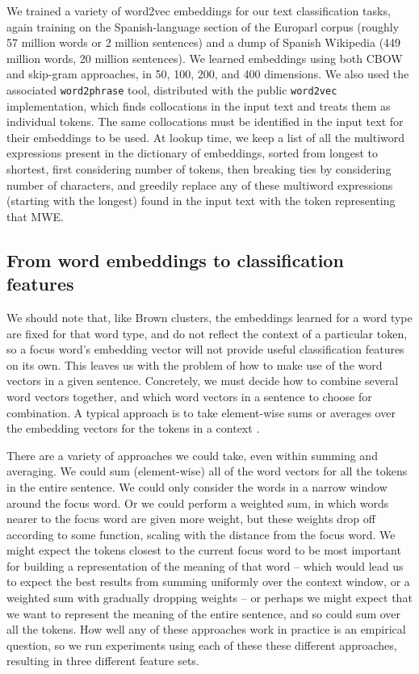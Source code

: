 We trained a variety of word2vec embeddings for our text classification tasks,
again training on the Spanish-language section of the Europarl corpus (roughly
57 million words or 2 million sentences) and a dump of Spanish Wikipedia (449
million words, 20 million sentences). We learned embeddings using both CBOW and
skip-gram approaches, in 50, 100, 200, and 400 dimensions. We also
used the associated \texttt{word2phrase} tool, distributed with the public
\texttt{word2vec} implementation, which finds collocations in the input text
and treats them as individual tokens. The same collocations must be identified
in the input text for their embeddings to be used. At lookup time, we keep a
list of all the multiword expressions present in the dictionary of embeddings,
sorted from longest to shortest, first considering number of tokens, then
breaking ties by considering number of characters, and greedily replace any of
these multiword expressions (starting with the longest) found in the input text
with the token representing that MWE.

\subsection{From word embeddings to classification features}
We should note that, like Brown clusters, the embeddings learned for a word
type are fixed for that word type, and do not reflect the context of a
particular token, so a focus word's embedding vector will not provide useful
classification features on its own. This leaves us with the problem of how to
make use of the word vectors in a given sentence. Concretely, we must decide
how to combine several word vectors together, and which word vectors in a
sentence to choose for combination. A typical approach is to take element-wise
sums or averages over the embedding vectors for the tokens in a context
\cite[Chapter 8]{Goldberg17}.

There are a variety of approaches we could take, even within summing and
averaging. We could sum (element-wise) all of the word vectors for all the
tokens in the entire sentence. We could only consider the words in a narrow
window around the focus word. Or we could perform a weighted sum, in which
words nearer to the focus word are given more weight, but these weights drop
off according to some function, scaling with the distance from the focus word.
We might expect the tokens closest to the current focus word to be most
important for building a representation of the meaning of that word -- which
would lead us to expect the best results from summing uniformly over the
context window, or a weighted sum with gradually dropping weights -- or perhaps
we might expect that we want to represent the meaning of the entire sentence,
and so could sum over all the tokens.
How well any of these approaches work in practice is an empirical question, so
we run experiments using each of these these different approaches, resulting in
three different feature sets.

